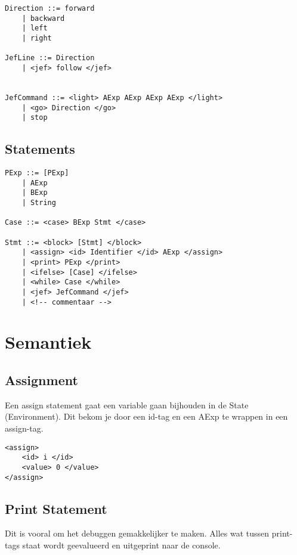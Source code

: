 \documentclass[]{article}
\begin{document}
\begin{lstlisting}
Direction ::= forward
    | backward
    | left
    | right
	
JefLine ::= Direction
    | <jef> follow </jef>


JefCommand ::= <light> AExp AExp AExp AExp </light> 
    | <go> Direction </go>
    | stop
\end{lstlisting}

\-

\subsection{Statements}

\begin{lstlisting} 
PExp ::= [PExp]
    | AExp
    | BExp
    | String

Case ::= <case> BExp Stmt </case>

Stmt ::= <block> [Stmt] </block>
    | <assign> <id> Identifier </id> AExp </assign>
    | <print> PExp </print>
    | <ifelse> [Case] </ifelse>
    | <while> Case </while>
    | <jef> JefCommand </jef>
    | <!-- commentaar -->

\end{lstlisting}






\newpage
\section{Semantiek}
\subsection{Assignment}
Een assign statement gaat een variable gaan bijhouden in de State (Environment).  Dit bekom je door een id-tag en een AExp te wrappen in een assign-tag.
\begin{lstlisting}
<assign>
    <id> i </id>
    <value> 0 </value>
</assign>
\end{lstlisting}

\subsection{Print Statement}
Dit is vooral om het debuggen gemakkelijker te maken. Alles wat tussen print-tags staat wordt geevalueerd en uitgeprint naar de console. 
\end{document}
